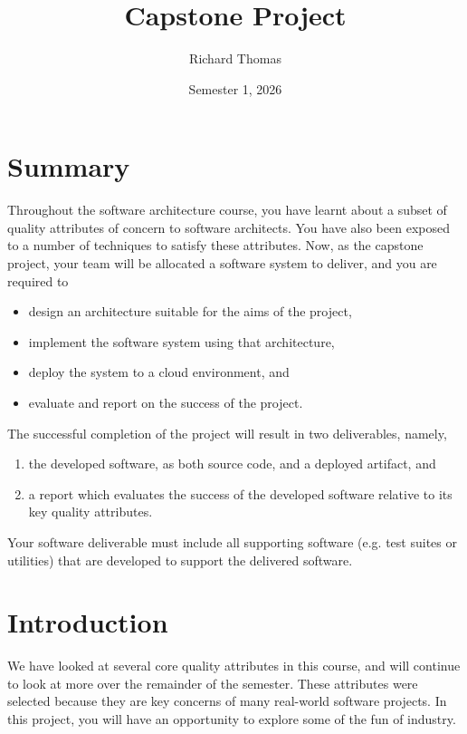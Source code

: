 \documentclass{csse4400}
\title{Capstone Project}
\author{Richard Thomas}
\date{Semester 1, 2026}
\begin{document}

\maketitle

\section*{Summary}
Throughout the software architecture course,
you have learnt about a subset of quality attributes of concern to software architects.
You have also been exposed to a number of techniques to satisfy these attributes.
Now, as the capstone project, your team will be allocated a software system to deliver, and you are required to
\begin{itemize}
    \item design an architecture suitable for the aims of the project,
    \item implement the software system using that architecture,
    \item deploy the system to a cloud environment, and
    \item evaluate and report on the success of the project.
\end{itemize}

\noindent
The successful completion of the project will result in two deliverables, namely,
\begin{enumerate}[label=\roman*]
    \item the developed software, as both source code, and a deployed artifact, and
    \item a report which evaluates the success of the developed software relative to its key quality attributes.
\end{enumerate}

\noindent
Your software deliverable must include all supporting software (e.g. test suites or utilities) that are developed to support the delivered software.


\section{Introduction}
We have looked at several core quality attributes in this course,
and will continue to look at more over the remainder of the semester.
These attributes were selected because they are key concerns of many real-world software projects.
In this project, you will have an opportunity to explore some of the fun of industry.
\end{document}
